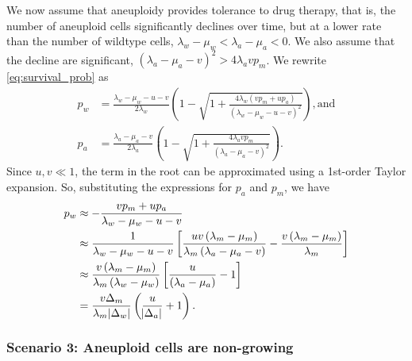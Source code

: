 \documentclass[12pt]{extarticle}
\begin{document}
\begin{appendices}
We now assume that aneuploidy provides tolerance to drug therapy, that is, the number of aneuploid cells significantly declines over time, but at a lower rate than the number of wildtype cells, $\lambda_w - \mu_w < \lambda_a - \mu_a < 0$. We also assume that the decline are significant, $\left(\lambda_a-\mu_a-v\right)^2 > 4\lambda_a v p_m$.
We rewrite \cref{eq:survival_prob} as
\begin{equation}
\begin{aligned}
p_w&=\frac{\lambda_w-\mu_w-u-v}{2\lambda_w}\left(1-\sqrt{1+\frac{4\lambda_w\left(vp_m+up_a\right)}{\left(\lambda_w-\mu_w-u-v\right)^2}}\right) ,
\text{and} \\
p_a&=\frac{\lambda_a-\mu_a-v}{2\lambda_a}\left(1-\sqrt{1+\frac{4\lambda_avp_m}{\left(\lambda_a-\mu_a-v\right)^2}}\right) .
\end{aligned}
\end{equation}
Since $u,v\ll1$, the term in the root can be approximated using a 1st-order Taylor expansion. So, substituting the expressions for $p_a$ and $p_m$, we have
\begin{equation} \label{eq:survprobwinitial}
\begin{aligned}
p_w&\approx-\frac{vp_m+up_a}{\lambda_w-\mu_w-u-v}\\
&\approx\frac{1}{\lambda_w-\mu_w-u-v}\left[\frac{uv\left(\lambda_m-\mu_m\right)}{\lambda_m\left(\lambda_a-\mu_a-v\right)}-\frac{v\left(\lambda_m-\mu_m\right)}{\lambda_m}\right]\\ %
&\approx\frac{v\left(\lambda_m-\mu_m\right)}{\lambda_m\left(\lambda_w-\mu_w\right)}\left[\frac{u}{\left(\lambda_a-\mu_a\right)}-1\right] \\
&=\frac{v\Delta_m}{\lambda_m \abs{\Delta_w}}\left(\frac{u}{\abs{\Delta_a}}+1\right) .
\end{aligned}
\end{equation}

\subsubsection*{Scenario 3: Aneuploid cells are non-growing} %


\end{appendices}
\end{document}
